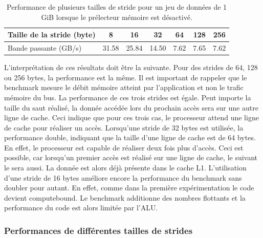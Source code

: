         \begin{table}[ht!]
        \centering
        \begin{tabular}{|l|c|c|c|c|c|c|}
        \hline
        Taille de la stride (byte) & 8 & 16 & 32 & 64 & 128 & 256 \\ \hline
        Bande passante (GB/s) & 31.58 & 25.84 & 14.50 & 7.62 & 7.65 & 7.62 \\ \hline
        \end{tabular}%
        \caption{Performance de plusieurs tailles de stride pour un jeu de données de 1 GiB lorsque le prélecteur mémoire est désactivé.}
        \label{tab:dml_cache_line}
        \end{table}
        
         L'interprétation de ces résultats doit être la suivante. Pour des \glspl{stride} de 64, 128 ou 256 bytes, la performance est la même. Il est important de rappeler que le benchmark mesure le débit mémoire atteint par l'application et non le trafic mémoire du bus. La performance de ces trois strides est égale.  Peut importe la taille du saut réalisé, la donnée accédée lors du prochain accès sera sur une autre ligne de cache. Ceci indique que pour ces trois cas, le processeur attend une ligne de cache pour réaliser un accès.  Lorsqu'une stride de 32 bytes est utilisée, la performance double, indiquant que la taille d'une ligne de cache est de 64 bytes. En effet, le processeur est capable de réaliser deux fois plus d'accès. Ceci est possible, car lorsqu'un premier accès est réalisé sur une ligne de cache, le suivant le sera aussi. La donnée est alors déjà présente dans le cache L1. L'utilisation d'une stride de 16 bytes améliore encore la performance du benchmark sans doubler pour autant. En effet, comme dans la première expérimentation le code devient \gls{computebound}. Le benchmark additionne des nombres flottants et la performance du code est alors limitée par l'ALU. 
    
    
    \subsubsection{Performances de différentes tailles de strides} \label{sec:dml_bad_stride}
        
